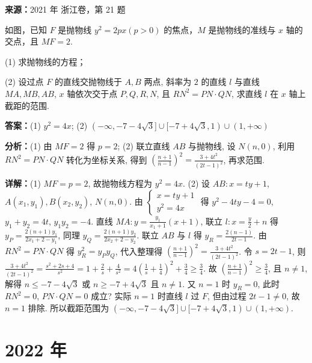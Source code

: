 \begin{question}[points=15]
\textbf{来源：}2021 年 浙江卷，第 21 题\par
如图，已知 $F$ 是抛物线 $y^2=2px (p>0)$ 的焦点，$M$ 是抛物线的准线与 $x$ 轴的交点，且 $MF=2$.

(1) 求抛物线的方程；

(2) 设过点 $F$ 的直线交抛物线于 $A,B$ 两点, 斜率为 $2$ 的直线 $l$ 与直线 $MA, MB, AB$, $x$ 轴依次交于点 $P,Q,R,N$, 且 $RN^2 = PN\cdot QN$, 求直线 $l$ 在 $x$ 轴上截距的范围.
\begin{solution}
\textbf{答案：}(1) $y^2=4x$; (2) $(-\infty, -7-4\sqrt{3}] \cup [-7+4\sqrt{3},1) \cup (1,+\infty)$

\textbf{分析：}(1) 由 $MF=2$ 得 $p=2$; (2) 联立直线 $AB$ 与抛物线, 设 $N(n,0)$, 利用 $RN^2=PN\cdot QN$ 转化为坐标关系, 得到 $\left(\frac{n+1}{n-1}\right)^2 = \frac{3+4t^2}{(2t-1)^2}$, 再求范围.

\textbf{详解：}(1) $MF = p = 2$, 故抛物线方程为 $y^2=4x$.
(2) 设 $AB: x=ty+1$, $A(x_1,y_1), B(x_2,y_2)$, $N(n,0)$. 由 $\begin{cases}x=ty+1\\ y^2=4x\end{cases}$ 得 $y^2-4ty-4=0$, $y_1+y_2=4t$, $y_1y_2=-4$. 直线 $MA: y=\frac{y_1}{x_1+1}(x+1)$, 联立 $l: x=\frac{y}{2}+n$ 得 $y_P = \frac{2(n+1)y_1}{2x_1+2-y_1}$, 同理 $y_Q = \frac{2(n+1)y_2}{2x_2+2-y_2}$. 联立 $AB$ 与 $l$ 得 $y_R = \frac{2(n-1)}{2t-1}$. 由 $RN^2=PN\cdot QN$ 得 $y_R^2 = y_P y_Q$, 代入整理得 $\left(\frac{n+1}{n-1}\right)^2 = \frac{3+4t^2}{(2t-1)^2}$. 令 $s=2t-1$, 则 $\frac{3+4t^2}{(2t-1)^2} = \frac{s^2+2s+4}{s^2} = 1+\frac{2}{s}+\frac{4}{s^2} = 4\left(\frac{1}{s}+\frac14\right)^2 + \frac34 \geq \frac34$. 故 $\left(\frac{n+1}{n-1}\right)^2 \geq \frac34$, 且 $n\neq1$, 解得 $n\leq -7-4\sqrt{3}$ 或 $n\geq -7+4\sqrt{3}$ 且 $n\neq1$. 又 $n=1$ 时 $y_R=0$, 此时 $RN^2=0$, $PN\cdot QN=0$ 成立? 实际 $n=1$ 时直线 $l$ 过 $F$, 但由过程 $2t-1\neq0$, 故 $n=1$ 排除. 所以截距范围为 $(-\infty, -7-4\sqrt{3}] \cup [-7+4\sqrt{3},1) \cup (1,+\infty)$.
\end{solution}
\end{question}

\section*{2022 年}

